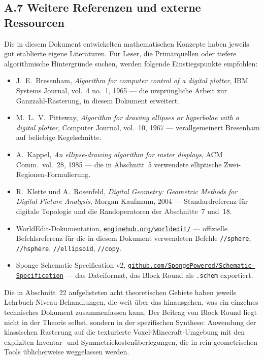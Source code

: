 \documentclass[12pt,a4paper]{scrartcl}
\newcommand{\code}[1]{\texttt{\small #1}}
\newcommand{\cmd}[1]{\textcolor{earth}{\texttt{\small #1}}}
\newcommand{\biblink}[2]{\href{#1}{\nolinkurl{#2}}}
\begin{document}
\subsection*{A.7 Weitere Referenzen und externe Ressourcen}

Die in diesem Dokument entwickelten mathematischen Konzepte haben jeweils gut etablierte eigene Literaturen. Für Leser, die Primärquellen oder tiefere algorithmische Hintergründe suchen, werden folgende Einstiegspunkte empfohlen:

\begin{itemize}[leftmargin=1.4em,itemsep=0.2em,topsep=0.3em]
  \item J.~E.~Bresenham, \emph{Algorithm for computer control of a digital plotter}, IBM Systems Journal, vol.~4 no.~1, 1965 --- die ursprüngliche Arbeit zur Ganzzahl-Rasterung, in diesem Dokument erweitert.
  \item M.~L.~V.~Pitteway, \emph{Algorithm for drawing ellipses or hyperbolae with a digital plotter}, Computer Journal, vol.~10, 1967 --- verallgemeinert Bresenham auf beliebige Kegelschnitte.
  \item A.~Kappel, \emph{An ellipse-drawing algorithm for raster displays}, ACM Comm.\ vol.~28, 1985 --- die in Abschnitt~5 verwendete elliptische Zwei-Regionen-Formulierung.
  \item R.~Klette und A.~Rosenfeld, \emph{Digital Geometry: Geometric Methods for Digital Picture Analysis}, Morgan Kaufmann, 2004 --- Standardreferenz für digitale Topologie und die Randoperatoren der Abschnitte~7 und~18.
  \item WorldEdit-Dokumentation, \biblink{https://enginehub.org/worldedit/}{enginehub.org/worldedit/} --- offizielle Befehlsreferenz für die in diesem Dokument verwendeten Befehle \cmd{//sphere}, \cmd{//hsphere}, \cmd{//ellipsoid}, \cmd{//copy}.
  \item Sponge Schematic Specification v2, \biblink{https://github.com/SpongePowered/Schematic-Specification}{github.com/SpongePowered/Schematic-Specification} --- das Dateiformat, das Block Round als \code{.schem} exportiert.
\end{itemize}

Die in Abschnitt~22 aufgelisteten acht theoretischen Gebiete haben jeweils Lehrbuch-Niveau-Behandlungen, die weit über das hinausgehen, was ein einzelnes technisches Dokument zusammenfassen kann. Der Beitrag von Block Round liegt nicht in der Theorie selbst, sondern in der spezifischen Synthese: Anwendung der klassischen Rasterung auf die texturierte Voxel-Minecraft-Umgebung mit den expliziten Inventar- und Symmetriekostenüberlegungen, die in rein geometrischen Tools üblicherweise weggelassen werden.
\end{document}
